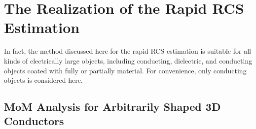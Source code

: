 \documentclass[conference, a4paper]{IEEEtran}
\begin{document}
%



%

\section{The Realization of the Rapid RCS Estimation}

In fact, the method discussed here for the rapid RCS estimation is suitable 
for all kinds of electrically large objects, including conducting, 
dielectric, and conducting objects coated with fully or partially material. For 
convenience, only conducting objects is considered here.

\subsection{MoM Analysis for Arbitrarily Shaped 3D Conductors}
\end{document}
